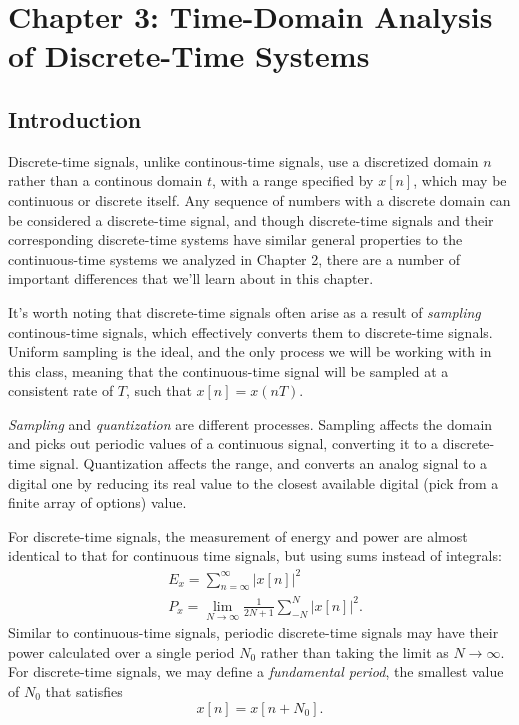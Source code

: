 \documentclass{article}
\begin{document}
\setcounter{section}{2}
\section{Chapter 3: Time-Domain Analysis of Discrete-Time Systems} 
\setcounter{subsection}{0}
\subsection{Introduction}
Discrete-time signals, unlike continous-time signals, use a discretized domain \(n\) rather than a continous domain \(t\), with a range specified by \(x[n]\), which may be continuous or discrete itself. Any sequence of numbers with a discrete domain can be considered a discrete-time signal, and though discrete-time signals and their corresponding discrete-time systems have similar general properties to the continuous-time systems we analyzed in Chapter 2, there are a number of important differences that we'll learn about in this chapter.

It's worth noting that discrete-time signals often arise as a result of \textit{sampling} continous-time signals, which effectively converts them to discrete-time signals. Uniform sampling is the ideal, and the only process we will be working with in this class, meaning that the continuous-time signal will be sampled at a consistent rate of \(T\), such that \(x[n] = x(nT)\). 

\textit{Sampling} and \textit{quantization} are different processes. Sampling affects the domain and picks out periodic values of a continuous signal, converting it to a discrete-time signal. Quantization affects the range, and converts an analog signal to a digital one by reducing its real value to the closest available digital (pick from a finite array of options) value. 

For discrete-time signals, the measurement of energy and power are almost identical to that for continuous time signals, but using sums instead of integrals:
\begin{align*}
	&E_x = \sum_{n=\infty}^{\infty}|x[n]|^2 \\
	&P_x = \lim_{N \to \infty}\frac{1}{2N+1}\sum_{-N}^{N}|x[n]|^2.
\end{align*}
Similar to continuous-time signals, periodic discrete-time signals may have their power calculated over a single period \(N_0\) rather than taking the limit as \(N \to \infty\). For discrete-time signals, we may define a \textit{fundamental period}, the smallest value of \(N_0\) that satisfies
\[
	x[n] = x[n+N_0].
\]
\end{document}
